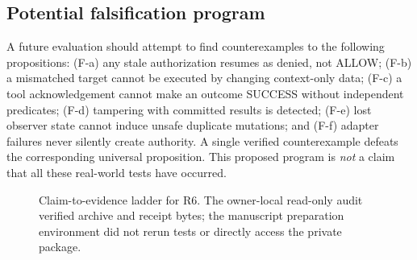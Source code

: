 \documentclass[11pt,twocolumn]{article}
\newcommand{\R}{\mathbb{R}}
\begin{document}
\subsection{Potential falsification program}
A future evaluation should attempt to find counterexamples to the following propositions: (F-a) any stale authorization resumes as denied, not ALLOW; (F-b) a mismatched target cannot be executed by changing context-only data; (F-c) a tool acknowledgement cannot make an outcome SUCCESS without independent predicates; (F-d) tampering with committed results is detected; (F-e) lost observer state cannot induce unsafe duplicate mutations; and (F-f) adapter failures never silently create authority. A single verified counterexample defeats the corresponding universal proposition. This proposed program is \emph{not} a claim that all these real-world tests have occurred.

\begin{figure}[t]
\centering
{}
\caption{Claim-to-evidence ladder for R6. The owner-local read-only audit verified archive and receipt bytes; the manuscript preparation environment did not rerun tests or directly access the private package.}
\label{fig:ladder}
\end{figure}
\end{document}

